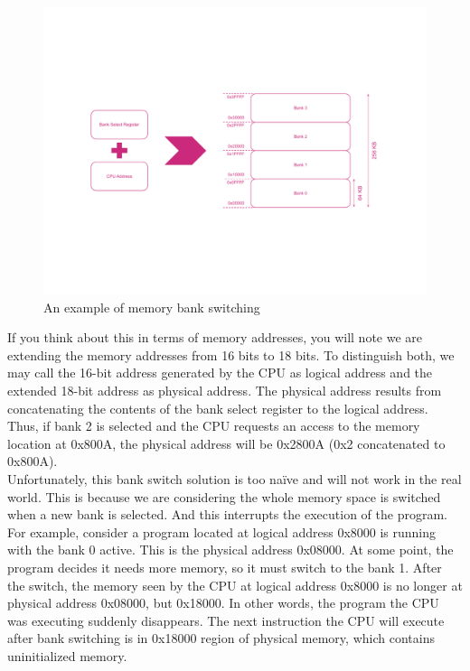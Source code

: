 \begin{figure}
	\centering
	\includegraphics[width=1\linewidth,trim={0cm 150 0 100}]{images/figures/msx-mem-banks}
	\caption{An example of memory bank switching}
	\label{fig:msx-mem-banks}
\end{figure}

If you think about this in terms of memory addresses, you will note we are extending the memory addresses from 16 bits to 18 bits. To distinguish both, we may call the 16-bit address generated by the CPU as logical address and the extended 18-bit address as physical address. The physical address results from concatenating the contents of the bank select register to the logical address. Thus, if bank 2 is selected and the CPU requests an access to the memory location at 0x800A, the physical address will be 0x2800A (0x2 concatenated to 0x800A). \\

Unfortunately, this bank switch solution is too naïve and will not work in the real world. This is because we are considering the whole memory space is switched when a new bank is selected. And this interrupts the execution of the program. \\

For example, consider a program located at logical address 0x8000 is running with the bank 0 active. This is the physical address 0x08000. At some point, the program decides it needs more memory, so it must switch to the bank 1. After the switch, the memory seen by the CPU at logical address 0x8000 is no longer at physical address 0x08000, but 0x18000. In other words, the program the CPU was executing suddenly disappears. The next instruction the CPU will execute after bank switching is in 0x18000 region of physical memory, which contains uninitialized memory. \\

